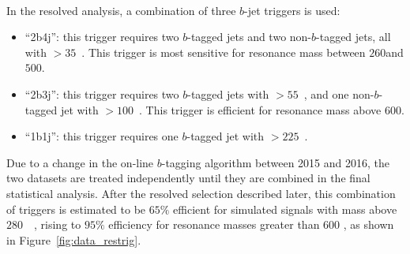 \paragraph{}
In the resolved analysis, a combination of three $b$-jet triggers is used:
\begin{itemize}
	\item ``2b4j'': this trigger requires two $b$-tagged jets and two non-$b$-tagged jets, all with \pt$>35$~\GeV. This trigger is most sensitive for resonance mass between $260$\GeV and $500$\GeV.
	\item ``2b3j'': this trigger requires two $b$-tagged jets with \pt$>55$~\GeV, and one non-$b$-tagged jet with \pt$>100$~\GeV. This trigger is efficient for resonance mass above $600$\GeV.
	\item ``1b1j'': this trigger requires one $b$-tagged jet with \pt$>225$~\GeV.
\end{itemize}
Due to a change in the on-line $b$-tagging algorithm between 2015 and 2016, the two datasets are treated independently until they are combined in the final statistical analysis. 
After the resolved selection described later, this combination of triggers is estimated to be $65\%$ efficient for simulated signals with mass above $280$~\GeV~, rising to $95\%$ efficiency for resonance masses greater than $600$ \GeV, as shown in Figure~\ref{fig:data_restrig}.

